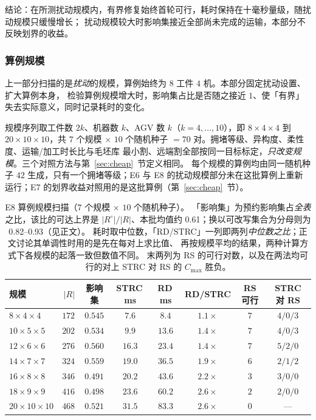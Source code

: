 \documentclass[manuscript,screen,review]{acmart}
\providecommand{\STRC}{\textsc{STRC}}
\newcommand{\NSeeds}{10}
\newcommand{\ScaleKs}{7}
\newcommand{\ScalePairs}{70}
\newcommand{\ScaleJobsHi}{20}
\newcommand{\ScaleMachHi}{10}
\newcommand{\ScaleAliveShare}{0.61}  %
\newcommand{\ScaleCloAliveLo}{0.82}  %
\newcommand{\ScaleCloAliveHi}{0.93}  %
\begin{document}
结论：在所测扰动规模内，有界修复始终首轮可行，耗时保持在十毫秒量级，随扰动规模只缓慢增长；
扰动规模较大时影响集接近全部尚未完成的运输，本部分不反映划界的收益。

\subsubsection{算例规模}
\label{sec:instscale}

上一部分扫描的是\emph{扰动}的规模，算例始终为 \(8\) 工件 \(4\) 机。本部分固定扰动设置、扩大算例本身，
检验算例规模增大时，影响集占比是否随之接近 \(1\)、使「有界」失去实际意义，同时记录耗时的变化。

规模序列取工件数 \(2k\)、机器数 \(k\)、AGV 数 \(k\)（\(k=4,\dots,10\)），即 \(8\times4\times4\) 到
\(\ScaleJobsHi\times\ScaleMachHi\times\ScaleMachHi\)，共 \(\ScaleKs\) 个规模 \(\times\)
\(\NSeeds\) 个随机种子 \(=\ScalePairs\) 对。拥堵等级、异构度、柔性度、运输/加工时长比与毛坯库
最小割、远端割全部按同一目标标定，\emph{只改变规模}。三个对照方法与第~\ref{sec:cheap}~节定义相同。
每个规模的算例均由同一随机种子 \(42\) 生成，只有一个拥堵等级；E6 与 E8 的扰动规模部分未在这批算例上重新运行；E7 的划界收益对照用的是这批算例（第~\ref{sec:cheap}~节）。

\begin{table}[t]
\centering
\caption{E8 算例规模扫描（\(\ScaleKs\) 个规模 \(\times\) \(\NSeeds\) 个随机种子）。
「影响集」为预约影响集占\emph{全表}之比，该比的可达上界是 \(|R^{\circ}|/|R|\)、本批均值约
\ScaleAliveShare；换以可改写集合为分母则为 \ScaleCloAliveLo--\ScaleCloAliveHi（见正文）。
耗时取中位数，「RD/\STRC{}」一列即两列\emph{中位数之比}；正文讨论其单调性时用的是先在每对上求比值、
再按规模平均的结果，两种计算方式下各规模的起落一致但数值不同。
末两列为 RS 的可行对数，以及在两法均可行的对上 \STRC{} 对 RS 的 \(C_{\max}\) 胜负。}
\label{tab:instscale}
\small
\begin{tabular}{@{}lrcccccc@{}}
\toprule
规模 & \(|R|\) & 影响集 & \STRC{}\,ms & RD\,ms & RD/\STRC{} & RS 可行 & \STRC{} 对 RS \\
\midrule
\(8\times4\times4\)    & \(172\) & \(0.545\) & \(7.6\)  & \(8.4\)  & \(1.1\times\) & \(7\) & \(4/0/3\) \\
\(10\times5\times5\)   & \(202\) & \(0.534\) & \(9.9\)  & \(13.6\) & \(1.4\times\) & \(7\) & \(4/0/3\) \\
\(12\times6\times6\)   & \(276\) & \(0.560\) & \(16.3\) & \(23.4\) & \(1.4\times\) & \(7\) & \(5/2/0\) \\
\(14\times7\times7\)   & \(324\) & \(0.559\) & \(19.0\) & \(36.5\) & \(1.9\times\) & \(6\) & \(2/1/2\) \\
\(16\times8\times8\)   & \(346\) & \(0.491\) & \(20.2\) & \(43.6\) & \(2.2\times\) & \(3\) & \(3/0/0\) \\
\(18\times9\times9\)   & \(416\) & \(0.498\) & \(23.6\) & \(60.2\) & \(2.6\times\) & \(2\) & \(2/0/0\) \\
\(20\times10\times10\) & \(468\) & \(0.521\) & \(31.5\) & \(83.3\) & \(2.6\times\) & \(0\) & --- \\
\bottomrule
\end{tabular}
\end{table}
\end{document}
